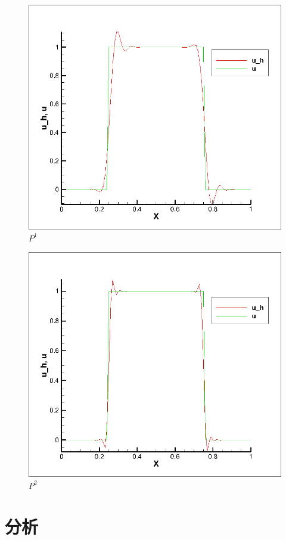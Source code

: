 \documentclass[12pt, a4paper]{ctexart}
\begin{document}
\begin{figure}[htbp]
	\centering
	\caption{$P^1$}
	\includegraphics[width=15cm]{P1.png}
\end{figure} 
\begin{figure}[htbp]
	\centering
	\caption{$P^2$}
	\includegraphics[width=15cm]{P2.png}
\end{figure} 
	
	\section{分析}
	
\end{document}
